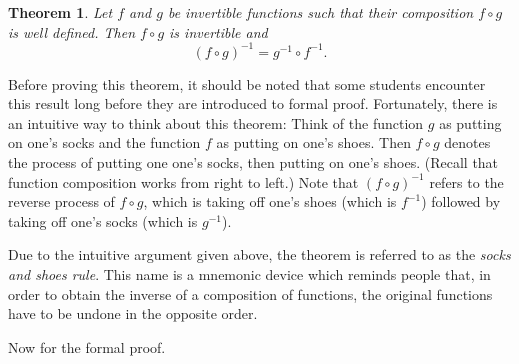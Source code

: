 \documentclass[12pt]{article}
\newtheorem*{thm*}{Theorem}
\begin{document}

\begin{thm*}
Let $f$ and $g$ be invertible functions such that their composition $f \circ g$ is well defined.  Then $f \circ g$ is invertible and
\[
(f \circ g)^{-1}=g^{-1} \circ f^{-1}.
\]
\end{thm*}

Before proving this theorem, it should be noted that some students encounter this result long before they are introduced to formal proof.  Fortunately, there is an intuitive way to think about this theorem:  Think of the function $g$ as putting on one's socks and the function $f$ as putting on one's shoes.  Then $f \circ g$ denotes the process of putting one one's socks, then putting on one's shoes.  (Recall that function composition works from right to left.)  Note that $(f \circ g)^{-1}$ refers to the reverse process of $f \circ g$, which is taking off one's shoes (which is $f^{-1}$) followed by taking off one's socks (which is $g^{-1}$).

Due to the intuitive argument given above, the theorem is referred to as the \emph{socks and shoes rule}.  This name is a mnemonic device which reminds people that, in order to obtain the inverse of a composition of functions, the original functions have to be undone in the opposite order.

Now for the formal proof.
\end{document}
